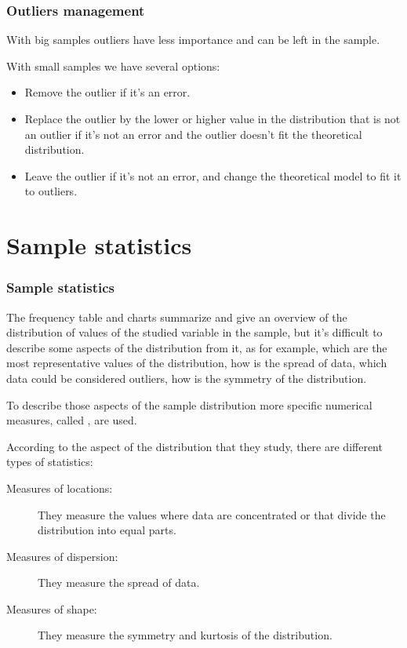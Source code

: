 \begin{frame}
\frametitle{Outliers management}
With big samples outliers have less importance and can be left in the sample.

With small samples we have several options:

\begin{itemize}
\item Remove the outlier if it's an error. 
\item Replace the outlier by the lower or higher value in the distribution that is not an outlier if it's not an error
and the outlier doesn't fit the theoretical distribution. 
\item Leave the outlier if it's not an error, and change the theoretical model to fit it to outliers.  
\end{itemize}
\end{frame}
 


\section{Sample statistics}

\begin{frame}
\frametitle{Sample statistics}
The frequency table and charts summarize and give an overview of the distribution of values of the studied variable in
the sample, but it's difficult to describe some aspects of the distribution from it, as for example, which are the most
representative values of the distribution, how is the spread of data, which data could be considered outliers, how is
the symmetry of the distribution. 

To describe those aspects of the sample distribution more specific numerical measures, called
, are used.

According to the aspect of the distribution that they study, there are different types of statistics:
\begin{description}
\item[Measures of locations:] They measure the values where data are concentrated or that divide the distribution into
equal parts. 
\item[Measures of dispersion:] They measure the spread of data.
\item[Measures of shape:] They measure the symmetry and kurtosis of the distribution.  
\end{description}
\end{frame}


